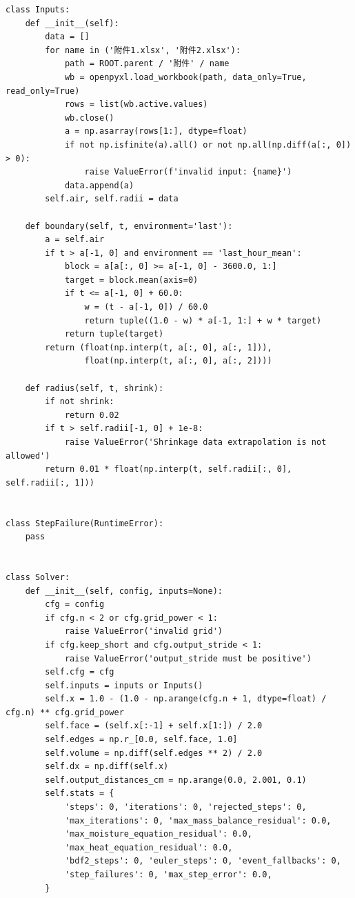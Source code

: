 \begin{verbatim}
class Inputs:
    def __init__(self):
        data = []
        for name in ('附件1.xlsx', '附件2.xlsx'):
            path = ROOT.parent / '附件' / name
            wb = openpyxl.load_workbook(path, data_only=True, read_only=True)
            rows = list(wb.active.values)
            wb.close()
            a = np.asarray(rows[1:], dtype=float)
            if not np.isfinite(a).all() or not np.all(np.diff(a[:, 0]) > 0):
                raise ValueError(f'invalid input: {name}')
            data.append(a)
        self.air, self.radii = data

    def boundary(self, t, environment='last'):
        a = self.air
        if t > a[-1, 0] and environment == 'last_hour_mean':
            block = a[a[:, 0] >= a[-1, 0] - 3600.0, 1:]
            target = block.mean(axis=0)
            if t <= a[-1, 0] + 60.0:
                w = (t - a[-1, 0]) / 60.0
                return tuple((1.0 - w) * a[-1, 1:] + w * target)
            return tuple(target)
        return (float(np.interp(t, a[:, 0], a[:, 1])),
                float(np.interp(t, a[:, 0], a[:, 2])))

    def radius(self, t, shrink):
        if not shrink:
            return 0.02
        if t > self.radii[-1, 0] + 1e-8:
            raise ValueError('Shrinkage data extrapolation is not allowed')
        return 0.01 * float(np.interp(t, self.radii[:, 0], self.radii[:, 1]))


class StepFailure(RuntimeError):
    pass


class Solver:
    def __init__(self, config, inputs=None):
        cfg = config
        if cfg.n < 2 or cfg.grid_power < 1:
            raise ValueError('invalid grid')
        if cfg.keep_short and cfg.output_stride < 1:
            raise ValueError('output_stride must be positive')
        self.cfg = cfg
        self.inputs = inputs or Inputs()
        self.x = 1.0 - (1.0 - np.arange(cfg.n + 1, dtype=float) / cfg.n) ** cfg.grid_power
        self.face = (self.x[:-1] + self.x[1:]) / 2.0
        self.edges = np.r_[0.0, self.face, 1.0]
        self.volume = np.diff(self.edges ** 2) / 2.0
        self.dx = np.diff(self.x)
        self.output_distances_cm = np.arange(0.0, 2.001, 0.1)
        self.stats = {
            'steps': 0, 'iterations': 0, 'rejected_steps': 0,
            'max_iterations': 0, 'max_mass_balance_residual': 0.0,
            'max_moisture_equation_residual': 0.0,
            'max_heat_equation_residual': 0.0,
            'bdf2_steps': 0, 'euler_steps': 0, 'event_fallbacks': 0,
            'step_failures': 0, 'max_step_error': 0.0,
        }


\end{verbatim}
